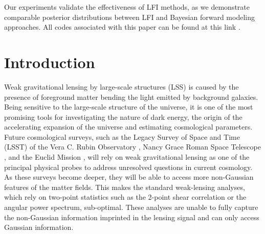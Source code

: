 \documentclass{aa}
\newcommand{\github}{\href{https://github.com/dlanzieri/WL_Implicit-Inference}{\faGithub}} %
\begin{document}
   {Our experiments validate the effectiveness of LFI methods, as we demonstrate comparable posterior distributions between LFI and Bayesian forward modeling approaches.
   All codes associated with this paper can be found at this link \github.}
   {}

   \maketitle

\section{Introduction}
Weak gravitational lensing by large-scale structures (LSS) is caused by the presence of foreground matter bending the light emitted by background galaxies. Being sensitive to the large-scale structure of the universe, it is one of the most promising tools for investigating the nature of dark energy, the origin of the accelerating expansion of the universe and estimating cosmological parameters. Future cosmological surveys, such as the Legacy Survey of Space and Time (LSST) of the Vera C. Rubin Observatory \citep{ivezic2019lsst}, Nancy Grace Roman Space Telescope \citep{spergel2015wide}, and the Euclid Mission \citep{laureijs2011euclid}, will rely on weak gravitational lensing as one of the principal physical probes to address unresolved questions in current cosmology.
 As these surveys become deeper, they will be able to access more non-Gaussian features of the matter fields. This makes the standard weak-lensing analyses, which rely on two-point statistics such as the 2-point shear correlation or the angular power spectrum, sub-optimal. These analyses are unable to fully capture the non-Gaussian information imprinted in the lensing signal and can only access Gaussian information.
\end{document}
